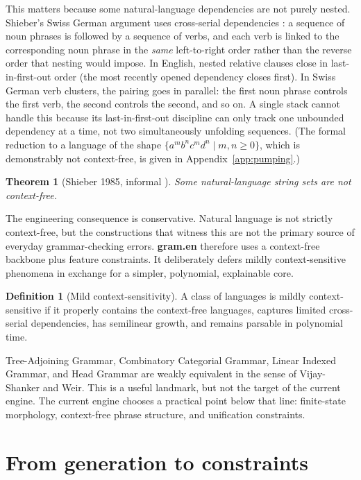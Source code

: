 \documentclass[11pt]{article}
\theoremstyle{definition}
\newtheorem{definition}{Definition}[section]
\theoremstyle{plain}
\newtheorem{theorem}{Theorem}[section]
\theoremstyle{remark}
\newcommand{\Gram}{\textbf{gram.en}}
\begin{document}
This matters because some natural-language dependencies are not purely nested.
Shieber's Swiss German argument uses cross-serial dependencies \cite{shieber1985cf}: a
sequence of noun phrases is followed by a sequence of verbs, and each verb is linked to
the corresponding noun phrase in the \emph{same} left-to-right order rather than the
reverse order that nesting would impose. In English, nested relative clauses close in
last-in-first-out order (the most recently opened dependency closes first). In Swiss German
verb clusters, the pairing goes in parallel: the first noun phrase controls the first verb,
the second controls the second, and so on. A single stack cannot handle this because its
last-in-first-out discipline can only track one unbounded dependency at a time, not two
simultaneously unfolding sequences. (The formal reduction to a language of the shape
$\{a^m b^n c^m d^n \mid m,n \ge 0\}$, which is demonstrably not context-free, is given
in Appendix~\ref{app:pumping}.)

\begin{theorem}[Shieber 1985, informal \cite{shieber1985cf}]
Some natural-language string sets are not context-free.
\end{theorem}

The engineering consequence is conservative. Natural language is not strictly
context-free, but the constructions that witness this are not the primary source
of everyday grammar-checking errors. \Gram{} therefore uses a context-free
backbone plus feature constraints. It deliberately defers mildly
context-sensitive phenomena in exchange for a simpler, polynomial, explainable
core.

\begin{definition}[Mild context-sensitivity]
A class of languages is mildly context-sensitive if it properly contains the
context-free languages, captures limited cross-serial dependencies, has
semilinear growth, and remains parsable in polynomial time.
\end{definition}

Tree-Adjoining Grammar, Combinatory Categorial Grammar, Linear Indexed Grammar,
and Head Grammar are weakly equivalent in the sense of Vijay-Shanker and Weir.
This is a useful landmark, but not the target of the current engine. The current
engine chooses a practical point below that line: finite-state morphology,
context-free phrase structure, and unification constraints.

\section{From generation to constraints}
\label{sec:unification}
\end{document}
